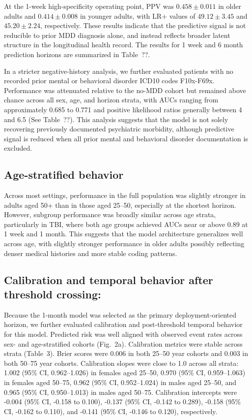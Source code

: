 \documentclass[onecolumn, compsoc,11pt]{IEEEtran}
\begin{document}
At the 1-week high-specificity operating point, PPV was $0.458 \pm 0.011$ in older adults and $0.414 \pm 0.008$ in younger adults, with LR$+$ values of $49.12 \pm 3.45$ and $45.20 \pm 2.24$, respectively. These results indicate that the predictive signal is not reducible to prior MDD diagnosis alone, and instead reflects broader latent structure in the longitudinal health record.
The results for 1 week and 6 month prediction horizons are summarized in Table~??.


In a stricter negative-history analysis, we further evaluated patients with no recorded prior mental or behavioral disorder ICD10 codes F10x-F69x. Performance was attenuated relative to the no-MDD cohort but remained above chance across all sex, age, and horizon strata, with AUCs ranging from approximately 0.685 to 0.771 and positive likelihood ratios generally between 4 and 6.5 (See Table~??). This analysis suggests that the model is not solely recovering previously documented psychiatric morbidity, although predictive signal is reduced when all prior mental and behavioral disorder documentation is excluded.

\subsection*{Age-stratified behavior}

Across most settings, performance in the full population was slightly stronger in adults aged 50+ than in those aged 25--50, especially at the shortest horizon. However, subgroup performance was broadly similar across age strata, particularly in TBI, where both age groups achieved AUCs near or above 0.89 at 1 week and 1 month. This suggests that the model architecture generalizes well across age, with slightly stronger performance in older adults possibly reflecting denser medical histories and more stable coding patterns.

\subsection*{Calibration and temporal behavior after threshold crossing:}
Because the 1-month model was selected as the primary deployment-oriented horizon, we further evaluated calibration and post-threshold temporal behavior for this model. Predicted risk was well aligned with observed event rates across sex- and age-stratified cohorts (Fig.~2a). Calibration metrics were stable across strata (Table~3). Brier scores were 0.006 in both 25--50 year cohorts and 0.003 in both 50--75 year cohorts. Calibration slopes were close to 1.0 across all strata: 1.002 (95\% CI, 0.962--1.026) in females aged 25--50, 0.970 (95\% CI, 0.959--1.063) in females aged 50--75, 0.962 (95\% CI, 0.952--1.024) in males aged 25--50, and 0.965 (95\% CI, 0.950--1.013) in males aged 50--75. Calibration intercepts were -0.004 (95\% CI, -0.158 to 0.100), -0.137 (95\% CI, -0.142 to 0.289), -0.158 (95\% CI, -0.162 to 0.110), and -0.141 (95\% CI, -0.146 to 0.120), respectively.
\end{document}
